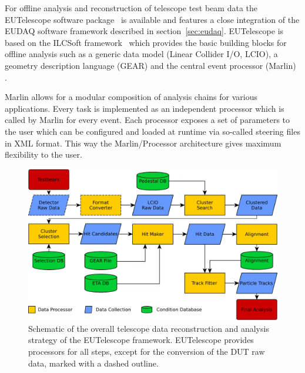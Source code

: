 
For offline analysis and reconstruction of telescope test beam data the EUTelescope software package~\cite{ref:eudetmemo_2010_12,ref:eutelwebsite}
 is available and features a close integration of the EUDAQ software framework described in section~\ref{sec:eudaq}.
EUTelescope is based on the ILCSoft framework~\cite{ref:eudetmemo_2009_12} which provides the basic building blocks for offline analysis such as a generic data model (Linear Collider I/O, LCIO),
a geometry description language (GEAR) and the central event processor (Marlin) \cite{ref:eudetreport_2007_11}.

Marlin allows for a modular composition of analysis chains for various applications. Every task is implemented as an independent processor which is called by Marlin for every event. 
Each processor exposes a set of parameters to the user which can be configured and loaded at runtime via so-called steering files in XML format.
This way the Marlin/Processor architecture gives maximum flexibility to the user.

\begin{figure}[tbp]
  \center
  \includegraphics[width=.9\textwidth]{figures/eutel-strategy}
  \caption[The EUTelescope data analysis strategy]{Schematic of the overall telescope data reconstruction and analysis strategy of the EUTelescope framework.
EUTelescope provides processors for all steps, except for the conversion of the DUT raw data, marked with a dashed outline.}
  \label{fig:offline:strategy}
\end{figure}

